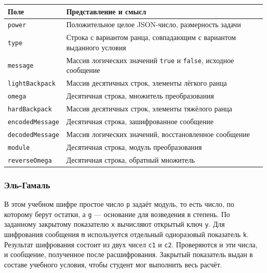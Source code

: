 \documentclass[12pt,a4paper]{article}
\begin{document}
{\def\LTcaptype{none} %
\begin{longtable}[]{@{}
  >{\raggedright\arraybackslash}p{}
  >{\raggedright\arraybackslash}p{}@{}}
\toprule\noalign{}
\begin{minipage}[b]{\linewidth}\raggedright
Поле
\end{minipage} & \begin{minipage}[b]{\linewidth}\raggedright
Представление и смысл
\end{minipage} \\
\midrule\noalign{}
\endhead
\bottomrule\noalign{}
\endlastfoot
\texttt{power} & Положительное целое JSON-число, размерность задачи \\
\texttt{type} & Строка с вариантом ранца, совпадающим с вариантом выданного условия \\
\texttt{message} & Массив логических значений \texttt{true} и \texttt{false}, исходное сообщение \\
\texttt{lightBackpack} & Массив десятичных строк, элементы лёгкого ранца \\
\texttt{omega} & Десятичная строка, множитель преобразования \\
\texttt{hardBackpack} & Массив десятичных строк, элементы тяжёлого ранца \\
\texttt{encodedMessage} & Десятичная строка, зашифрованное сообщение \\
\texttt{decodedMessage} & Массив логических значений, восстановленное сообщение \\
\texttt{module} & Десятичная строка, модуль преобразования \\
\texttt{reverseOmega} & Десятичная строка, обратный множитель \\
\end{longtable}
}

\subsubsection{Эль-Гамаль}\label{ux44dux43bux44c-ux433ux430ux43cux430ux43bux44c}

\hypertarget{эль-гамаль}{}

В этом учебном шифре простое число \texttt{p} задаёт модуль, то есть число, по которому берут остатки, а \texttt{g} --- основание для возведения в степень. По заданному закрытому показателю \texttt{x} вычисляют открытый ключ \texttt{y}. Для шифрования сообщения \texttt{m} используется отдельный одноразовый показатель \texttt{k}. Результат шифрования состоит из двух чисел \texttt{c1} и \texttt{c2}. Проверяются и эти числа, и сообщение, полученное после расшифрования. Закрытый показатель выдан в составе учебного условия, чтобы студент мог выполнить весь расчёт.
\end{document}

